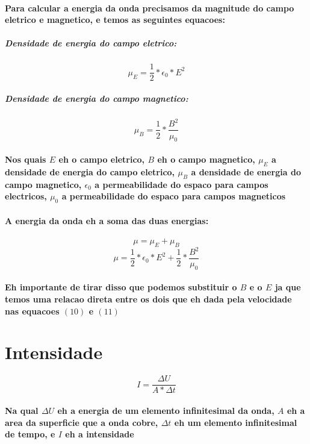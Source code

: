 \documentclass[12pt,twoside, a4paper, twocolumn]{article}
\begin{document}
\paragraph*{Para calcular a energia da onda precisamos da magnitude do campo eletrico e magnetico, e temos as seguintes equacoes:}

\subparagraph*{Densidade de energia do campo eletrico:}
\begin{equation}
    \mu_E = \frac{1}{2} * \epsilon_0 * E^2
\end{equation}

\subparagraph*{Densidade de energia do campo magnetico:}
\begin{equation}
    \mu_B = \frac{1}{2} * \frac{B^2}{\mu_0}
\end{equation}

\paragraph{Nos quais $E$ eh o campo eletrico, $B$ eh o campo magnetico, $\mu_E$ a densidade de energia do campo eletrico, $\mu_B$ a densidade de energia do campo magnetico, $\epsilon_0$ a permeabilidade do espaco para campos electricos, $\mu_0$ a permeabilidade do espaco para campos magneticos}
\paragraph{A energia da onda eh a soma das duas energias:}
\begin{equation}
    \mu = \mu_E + \mu_B
\end{equation}
\begin{equation}
    \mu = \frac{1}{2} * \epsilon_0 * E^2 + \frac{1}{2} * \frac{B^2}{\mu_0}
\end{equation}
\paragraph{Eh importante de tirar disso que podemos substituir o $B$ e o $E$ ja que temos uma relacao direta entre os dois que eh dada pela velocidade nas equacoes $(10)$ e $(11)$}

\section*{Intensidade}
\begin{equation}
    I = \frac{\Delta{U}}{A * \Delta{t}}
\end{equation}
\paragraph*{Na qual $\Delta{U}$ eh a energia de um elemento infinitesimal da onda, $A$ eh a area da superficie que a onda cobre, $\Delta{t}$ eh um elemento infinitesimal de tempo, e $I$ eh a intensidade}
\end{document}
